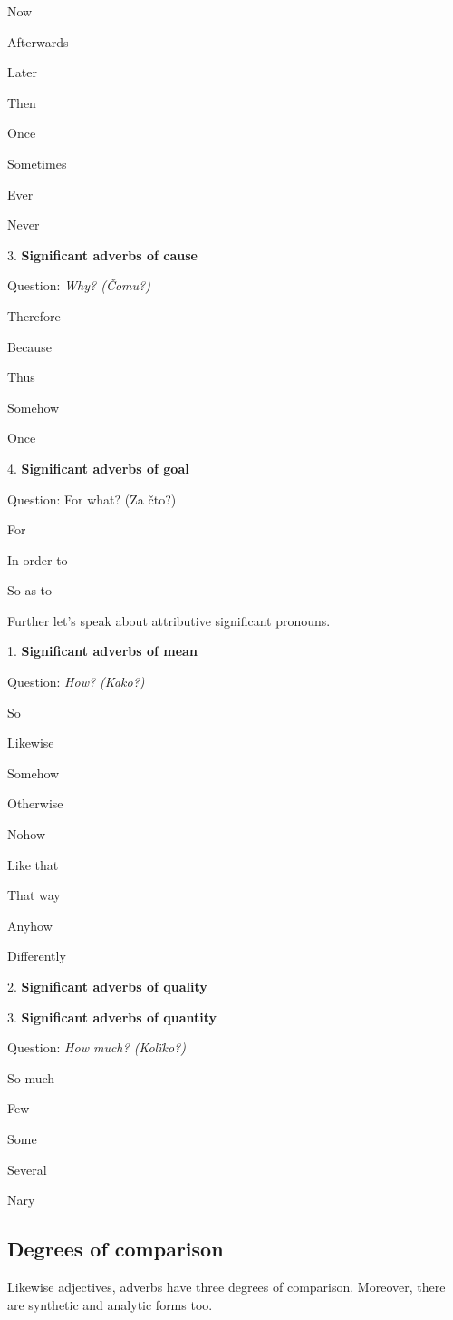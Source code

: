 Now

Afterwards

Later

Then

Once

Sometimes

Ever

Never


3. \textbf{Significant adverbs of cause}

Question: \textit{Why? (Čomu?)}

Therefore

Because

Thus

Somehow

Once


4. \textbf{Significant adverbs of goal}

Question: For what? (Za čto?)

For

In order to

So as to


Further let’s speak about attributive significant pronouns.

1. \textbf{Significant adverbs of mean}

Question: \textit{How? (Kako?)}

So

Likewise

Somehow

Otherwise

Nohow

Like that

That way

Anyhow

Differently

2. \textbf{Significant adverbs of quality}


3.\textbf{ Significant adverbs of quantity}

Question: \textit{How much? (Kolïko?)}

So much

Few

Some

Several

Nary

\subsection{Degrees of comparison}

Likewise adjectives, adverbs have three degrees of comparison. Moreover, there are synthetic and analytic forms too. 

